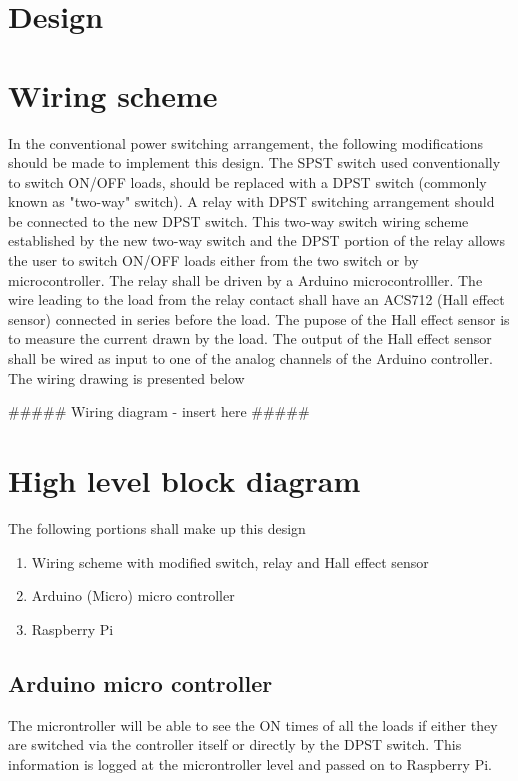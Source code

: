 \documentclass[a4paper,11pt,titlepage]{article}
\begin{document}
\section{Design}
\label{sec:org95caea1}

\section{Wiring scheme}
\label{sec:org413352c}
In the conventional power switching arrangement, the following
modifications should be made to implement this design. The SPST switch
used conventionally to switch ON/OFF loads, should be replaced with a
DPST switch (commonly known as "two-way" switch). A relay with DPST
switching arrangement should be connected to the new DPST switch. This
two-way switch wiring scheme established by the new two-way switch and
the DPST portion of the relay allows the user to switch ON/OFF loads
either from the two switch or by microcontroller. The relay shall be
driven by a Arduino microcontrolller. The wire leading to the load
from the relay contact shall have an ACS712 (Hall effect sensor)
connected in series before the load. The pupose of the Hall effect
sensor is to measure the current drawn by the load. The output of the
Hall effect sensor shall be wired as input to one of the analog
channels of the Arduino controller.  The wiring drawing is presented below

\#\#\#\#\# Wiring diagram - insert here \#\#\#\#\#

\section{High level block diagram}
\label{sec:orge222f56}
The following portions shall make up this design
\begin{enumerate}
\item Wiring scheme with modified switch, relay and Hall effect sensor
\item Arduino (Micro) micro controller
\item Raspberry Pi
\end{enumerate}

\subsection{Arduino micro controller}
\label{sec:org469cd2b}
The microntroller will be able to see the ON times of all the loads if
either they are switched via the controller itself or directly by the
DPST switch. This information is logged at the microntroller level and
passed on to Raspberry Pi. 
\end{document}
